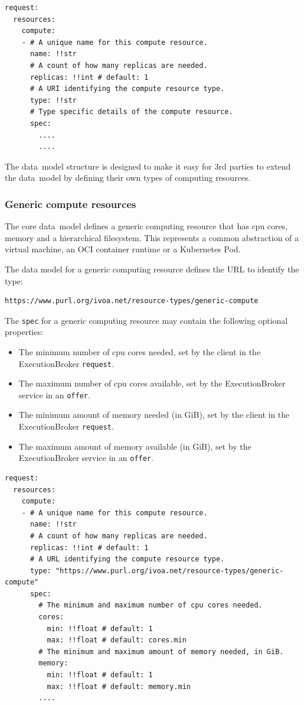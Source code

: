 \documentclass[11pt,a4paper]{ivoa}
\newcommand{\datamodel} {data~model}
\newcommand{\execbrokerclass} {ExecutionBroker}
\newcommand{\kubernetes} {Kubernetes}
\newcommand{\codeword}[1] {\texttt{#1}}
\begin{document}
\begin{lstlisting}[]
request:
  resources:
    compute:
    - # A unique name for this compute resource.
      name: !!str
      # A count of how many replicas are needed.
      replicas: !!int # default: 1
      # A URI identifying the compute resource type.
      type: !!str
      # Type specific details of the compute resource.
      spec:
        ....
        ....
\end{lstlisting}

The \datamodel{} structure is designed to make it easy for 3rd parties
to extend the \datamodel{} by defining their own types of computing
resources.

\subsubsection{Generic compute resources}
\label{datamodel-generic-compute}

The core \datamodel{} defines a generic computing resource
that has cpu cores, memory and a hierarchical filesystem.
This represents a common abstraction of a virtual machine,
an OCI container runtime or a \kubernetes{} Pod.

The data model for a generic computing resource defines the URL to identify
the type:
\begin{lstlisting}[]
https://www.purl.org/ivoa.net/resource-types/generic-compute
\end{lstlisting}
\hfill \break
The \codeword{spec} for a generic computing resource may contain the following optional properties:
\begin{itemize}
    \item The minimum number of cpu cores needed, set by the client in the \execbrokerclass{} \codeword{request}.
    \item The maximum number of cpu cores available, set by the \execbrokerclass{} service in an \codeword{offer}.
    \item The minimum amount of memory needed (in GiB), set by the client in the \execbrokerclass{} \codeword{request}.
    \item The maximum amount of memory available (in GiB), set by the \execbrokerclass{} service in an \codeword{offer}.
\end{itemize}

\begin{lstlisting}[]
request:
  resources:
    compute:
    - # A unique name for this compute resource.
      name: !!str
      # A count of how many replicas are needed.
      replicas: !!int # default: 1
      # A URL identifying the compute resource type.
      type: "https://www.purl.org/ivoa.net/resource-types/generic-compute"
      spec:
        # The minimum and maximum number of cpu cores needed.
        cores:
          min: !!float # default: 1
          max: !!float # default: cores.min
        # The minimum and maximum amount of memory needed, in GiB.
        memory:
          min: !!float # default: 1
          max: !!float # default: memory.min
        ....
\end{lstlisting}
\end{document}
